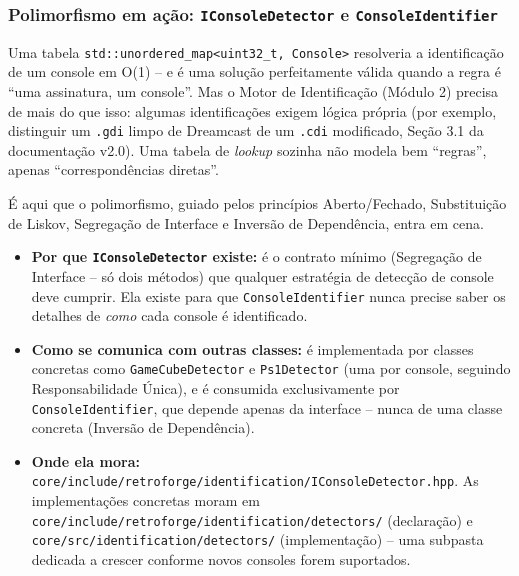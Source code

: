 \subsubsection{Polimorfismo em ação: \texttt{IConsoleDetector} e \texttt{ConsoleIdentifier}}

Uma tabela \texttt{std::unordered\_map<uint32\_t, Console>} resolveria a identificação de um console em O(1) -- e é uma solução perfeitamente válida quando a regra é ``uma assinatura, um console''. Mas o Motor de Identificação (Módulo 2) precisa de mais do que isso: algumas identificações exigem lógica própria (por exemplo, distinguir um \texttt{.gdi} limpo de Dreamcast de um \texttt{.cdi} modificado, Seção 3.1 da documentação v2.0). Uma tabela de \textit{lookup} sozinha não modela bem ``regras'', apenas ``correspondências diretas''.

É aqui que o polimorfismo, guiado pelos princípios Aberto/Fechado, Substituição de Liskov, Segregação de Interface e Inversão de Dependência, entra em cena.

\begin{itemize}
    \item \textbf{Por que \texttt{IConsoleDetector} existe:} é o contrato mínimo (Segregação de Interface -- só dois métodos) que qualquer estratégia de detecção de console deve cumprir. Ela existe para que \texttt{ConsoleIdentifier} nunca precise saber os detalhes de \textit{como} cada console é identificado.
    \item \textbf{Como se comunica com outras classes:} é implementada por classes concretas como \texttt{GameCubeDetector} e \texttt{Ps1Detector} (uma por console, seguindo Responsabilidade Única), e é consumida exclusivamente por \texttt{ConsoleIdentifier}, que depende apenas da interface -- nunca de uma classe concreta (Inversão de Dependência).
    \item \textbf{Onde ela mora:} \texttt{core/include/retroforge/identification/IConsoleDetector.hpp}. As implementações concretas moram em \texttt{core/include/retroforge/identification/detectors/} (declaração) e \texttt{core/src/identification/detectors/} (implementação) -- uma subpasta dedicada a crescer conforme novos consoles forem suportados.
\end{itemize}

